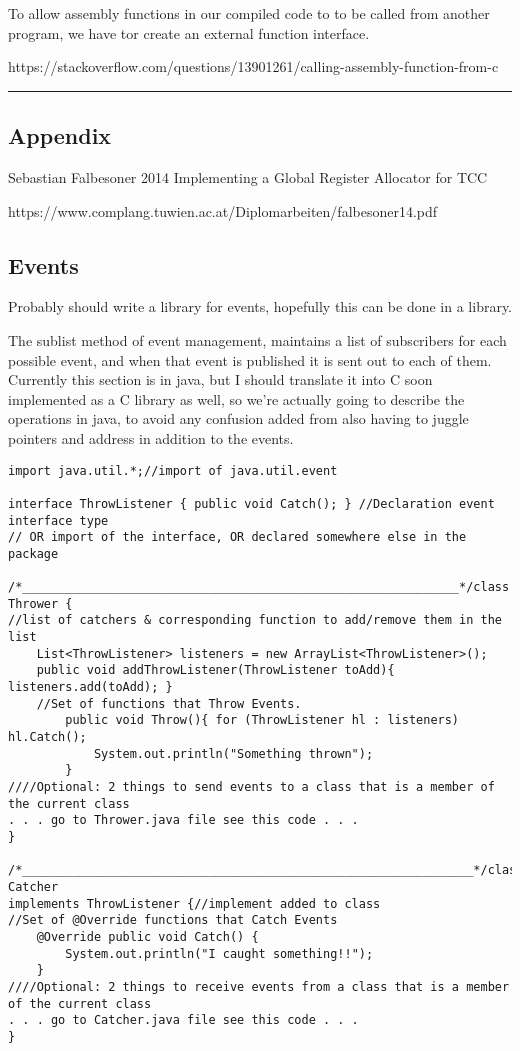 To allow assembly functions in our compiled code to to be called from
another program, we have tor create an external function interface.

https://stackoverflow.com/questions/13901261/calling-assembly-function-from-c

\begin{center}\rule{0.5\linewidth}{0.5pt}\end{center}

\hypertarget{appendix}{%
\subsection{Appendix}\label{appendix}}

Sebastian Falbesoner 2014 Implementing a Global Register Allocator for
TCC

https://www.complang.tuwien.ac.at/Diplomarbeiten/falbesoner14.pdf

\hypertarget{events}{%
\subsection{Events}\label{events}}

Probably should write a library for events, hopefully this can be done
in a library.

The sublist method of event management, maintains a list of subscribers
for each possible event, and when that event is published it is sent out
to each of them. Currently this section is in java, but I should
translate it into C soon implemented as a C library as well, so we're
actually going to describe the operations in java, to avoid any
confusion added from also having to juggle pointers and address in
addition to the events.

\begin{verbatim}
import java.util.*;//import of java.util.event

interface ThrowListener { public void Catch(); } //Declaration event interface type
// OR import of the interface, OR declared somewhere else in the package

/*_____________________________________________________________*/class Thrower {
//list of catchers & corresponding function to add/remove them in the list
    List<ThrowListener> listeners = new ArrayList<ThrowListener>();
    public void addThrowListener(ThrowListener toAdd){ listeners.add(toAdd); }
    //Set of functions that Throw Events.
        public void Throw(){ for (ThrowListener hl : listeners) hl.Catch();
            System.out.println("Something thrown");
        }
////Optional: 2 things to send events to a class that is a member of the current class
. . . go to Thrower.java file see this code . . .
}

/*_______________________________________________________________*/class Catcher
implements ThrowListener {//implement added to class
//Set of @Override functions that Catch Events
    @Override public void Catch() {
        System.out.println("I caught something!!");
    }
////Optional: 2 things to receive events from a class that is a member of the current class
. . . go to Catcher.java file see this code . . .
}
\end{verbatim}

